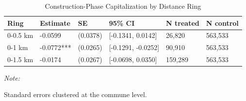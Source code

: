 \begin{table}[!h]
\centering
\caption{\label{tab:tab:distance}Construction-Phase Capitalization by Distance Ring}
\centering
\begin{threeparttable}
\begin{tabular}[t]{llllll}
\toprule
Ring & Estimate & SE & 95\% CI & N treated & N control\\
\midrule
0-0.5 km & -0.0599 & (0.0378) & {}[-0.1341, 0.0142] & 26,820 & 563,533\\
0-1 km & -0.0772*** & (0.0265) & {}[-0.1291, -0.0252] & 90,910 & 563,533\\
0-1.5 km & -0.0174 & (0.0267) & {}[-0.0698, 0.0350] & 159,289 & 563,533\\
\bottomrule
\end{tabular}
\begin{tablenotes}
\item \textit{Note: } 
\item Standard errors clustered at the commune level.
\end{tablenotes}
\end{threeparttable}
\end{table}
